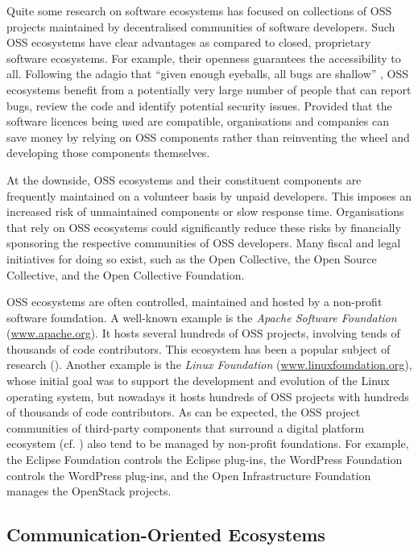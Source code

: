 Quite some research on software ecosystems has focused on collections of OSS projects maintained by decentralised communities of software developers.
Such OSS ecosystems have clear advantages as compared to closed, proprietary software ecosystems. For example, their openness guarantees the accessibility to all. Following the adagio that ``given enough eyeballs, all bugs are shallow'' \cite{Raymond:Cathedral:2001}, OSS ecosystems benefit from a potentially very large number of people that can report bugs, review the code and identify potential security issues.
Provided that the software licences being used are compatible, organisations and companies can save money by relying on OSS components rather than reinventing the wheel and developing those components themselves.

At the downside, OSS ecosystems and their constituent components are frequently maintained on a volunteer basis by unpaid developers. This imposes an increased risk of unmaintained components or slow response time. Organisations that rely on OSS ecosystems could significantly reduce these risks by financially sponsoring the respective communities of OSS developers. Many fiscal and legal initiatives for doing so exist, such as the Open Collective, the Open Source Collective, and  the Open Collective Foundation.

OSS ecosystems are often controlled, maintained and hosted by a non-profit software foundation.
A well-known example is the \emph{Apache Software Foundation} (\url{www.apache.org}). It hosts several hundreds of OSS projects, involving tends of thousands of code contributors. This ecosystem has been a popular subject of research (\eg \cite{Bavota2013-ICSM, Chen:2017:CLP:3042021.3042046, Tan2020, Mockus:TOSEM:2002, Calefato2019-IST}).
%
Another example is the \emph{Linux Foundation} (\url{www.linuxfoundation.org}), whose initial goal was to support the development and evolution of the Linux operating system, but nowadays it hosts hundreds of OSS projects with hundreds of thousands of code contributors.
%
As can be expected, the OSS project communities of third-party components that surround a digital platform ecosystem (cf. ) also tend to be managed by non-profit foundations. For example, the Eclipse Foundation controls the Eclipse plug-ins, the WordPress Foundation controls the WordPress plug-ins, and the Open Infrastructure Foundation manages the OpenStack projects.


\subsection{Communication-Oriented Ecosystems}


